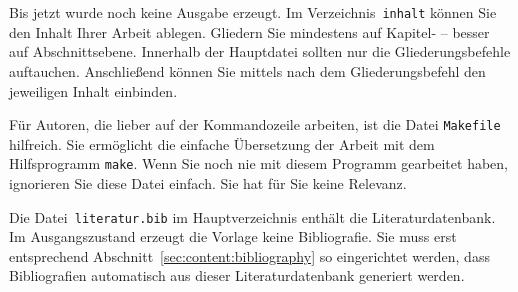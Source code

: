 Bis jetzt wurde noch keine Ausgabe erzeugt. Im Verzeichnis~\texttt{inhalt}
können Sie den Inhalt Ihrer Arbeit ablegen. Gliedern Sie mindestens auf
Kapitel- -- besser auf Abschnittsebene. Innerhalb der Hauptdatei sollten
nur die Gliederungsbefehle auftauchen. Anschließend können Sie mittels
\verb++ nach dem Gliederungsbefehl den jeweiligen Inhalt einbinden.

Für Autoren, die lieber auf der Kommandozeile arbeiten, ist die Datei
\texttt{Makefile} hilfreich. Sie ermöglicht die einfache Übersetzung der
Arbeit mit dem Hilfsprogramm \texttt{make}. Wenn Sie noch nie mit diesem
Programm gearbeitet haben, ignorieren Sie diese Datei einfach. Sie hat für
Sie keine Relevanz.

Die Datei~\texttt{literatur.bib} im Hauptverzeichnis enthält die
Literaturdatenbank. Im Ausgangszustand erzeugt die Vorlage keine Bibliografie.
Sie muss erst entsprechend Abschnitt~\ref{sec:content:bibliography} so
eingerichtet werden, dass Bibliografien automatisch aus dieser
Literaturdatenbank generiert werden.
